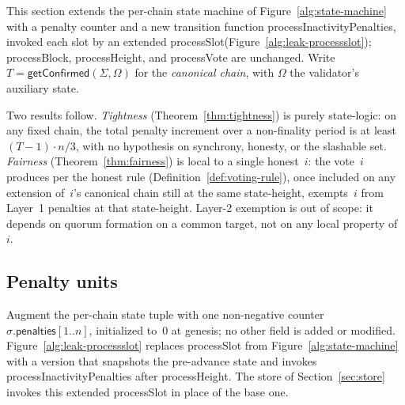 \ifx\litemode\undefined\documentclass{article}\fi
\newcommand{\penalties}{\mathsf{penalties}}
\newcommand{\processSlot}{\textsf{processSlot}\xspace}
\newcommand{\processBlock}{\textsf{processBlock}\xspace}
\newcommand{\processHeight}{\textsf{processHeight}\xspace}
\newcommand{\processVote}{\textsf{processVote}\xspace}
\newcommand{\processInactivityPenalties}{\textsf{processInactivityPenalties}\xspace}
\newcommand{\getConfirmed}{\textsf{getConfirmed}\xspace}
\theoremstyle{plain}
\theoremstyle{definition}
\theoremstyle{remark}
\begin{document}
This section extends the per-chain state machine of Figure~\ref{alg:state-machine} with a penalty counter and a new transition function \processInactivityPenalties, invoked each slot by an extended \processSlot (Figure~\ref{alg:leak-processslot}); \processBlock, \processHeight, and \processVote are unchanged.
Write $T = \getConfirmed(\Sigma, \Omega)$ for the \emph{canonical chain}, with $\Omega$ the validator's auxiliary state.

Two results follow.
\emph{Tightness} (Theorem~\ref{thm:tightness}) is purely state-logic: on any fixed chain, the total penalty increment over a non-finality period is at least $(T-1) \cdot n/3$, with no hypothesis on synchrony, honesty, or the slashable set.
\emph{Fairness} (Theorem~\ref{thm:fairness}) is local to a single honest~$i$: the vote~$i$ produces per the honest rule (Definition~\ref{def:voting-rule}), once included on any extension of~$i$'s canonical chain still at the same state-height, exempts~$i$ from Layer~1 penalties at that state-height.
Layer-2 exemption is out of scope: it depends on quorum formation on a common target, not on any local property of~$i$.

\subsection{Penalty units}

Augment the per-chain state tuple with one non-negative counter $\sigma.\penalties[1..n]$, initialized to~$0$ at genesis; no other field is added or modified.
Figure~\ref{alg:leak-processslot} replaces \processSlot from Figure~\ref{alg:state-machine} with a version that snapshots the pre-advance state and invokes \processInactivityPenalties after \processHeight.
The store of Section~\ref{sec:store} invokes this extended \processSlot in place of the base one.
\end{document}
